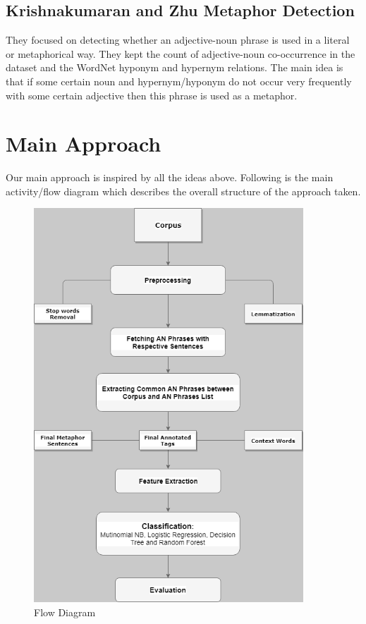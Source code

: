 \documentclass[a4paper]{article}
\begin{document}
\subsection{Krishnakumaran and Zhu Metaphor Detection}
They focused on detecting whether an adjective-noun phrase is used in a literal or metaphorical way. They kept the count of adjective-noun co-occurrence in the dataset and the WordNet hyponym and hypernym relations. The main idea is that if some certain noun and hypernym/hyponym do not occur very frequently with some certain adjective then this phrase is used as a metaphor.

\section{Main Approach}
Our main approach is inspired by all the ideas above. Following is the main activity/flow diagram which describes the overall structure of the approach taken.

\begin{figure}[h!]
  \centering
  \includegraphics[width=0.9\textwidth]{FlowChart}
  \caption{Flow Diagram}
\end{figure}
\end{document}
